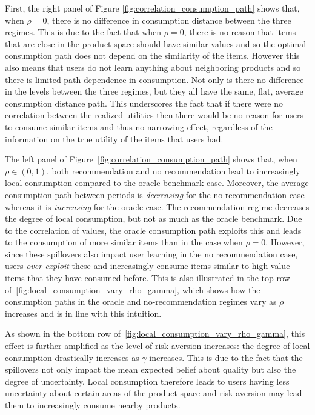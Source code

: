 \documentclass[manuscript]{acmart}
\begin{document}
First, the right panel of Figure \ref{fig:correlation_consumption_path} shows that, when $\rho = 0$, there is no difference in consumption distance between the three regimes. This is due to the fact that when $\rho = 0$, there is no reason that items that are close in the product space should have similar values and so the optimal consumption path does not depend on the similarity of the items. However this also means that users do not learn anything about neighboring products and so there is limited path-dependence in consumption. Not only is there no difference in the levels between the three regimes, but they all have the same, flat, average consumption distance path. This underscores the fact that if there were no correlation between the realized utilities then there would be no reason for users to consume similar items and thus no narrowing effect, regardless of the information on the true utility of the items that users had.
\par
The left panel of Figure~\ref{fig:correlation_consumption_path} shows that, when $\rho \in (0,1)$, both recommendation and no recommendation lead to increasingly local consumption compared to the oracle benchmark case. Moreover, the average consumption path between periods is \textit{decreasing} for the no recommendation case whereas it is \textit{increasing} for the oracle case. The recommendation regime decreases the degree of local consumption, but not as much as the oracle benchmark. Due to the correlation of values, the oracle consumption path exploits this and leads to the consumption of more similar items than in the case when $\rho = 0$. However, since these spillovers also impact user learning in the no recommendation case, users \textit{over-exploit} these and increasingly consume items similar to high value items that they have consumed before. This is also illustrated in the top row of~\autoref{fig:local_consumption_vary_rho_gamma}, which shows how the consumption paths in the oracle and no-recommendation regimes vary as $\rho$ increases and is in line with this intuition.
\par
As shown in the bottom row of~\autoref{fig:local_consumption_vary_rho_gamma}, this effect is further amplified as the level of risk aversion increases: the degree of local consumption drastically increases as $\gamma$ increases. This is due to the fact that the spillovers not only impact the mean expected belief about quality but also the degree of uncertainty. Local consumption therefore leads to users having less uncertainty about certain areas of the product space and risk aversion may lead them to increasingly consume nearby products.
\end{document}
